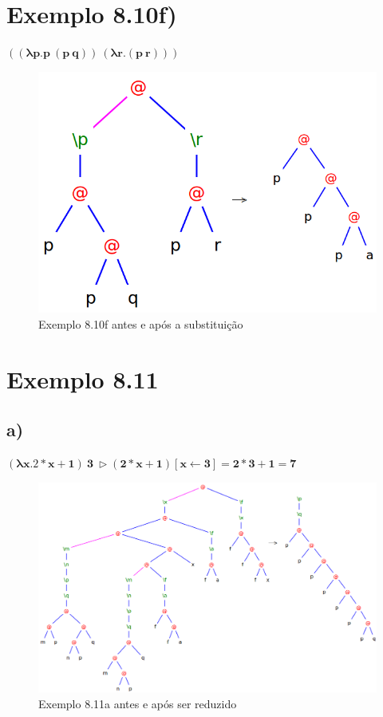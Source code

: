 \documentclass[a4paper]{article}
\begin{document}
\FloatBarrier

\section*{Exemplo 8.10f)}

$\mathbf{((\lambda p.p\ (p\ q))\ (\lambda r.(p\ r)))}$

\begin{figure}[h]
  \centering
  \includegraphics[scale=0.5]{8-10f.png}
  \caption{Exemplo 8.10f antes e após a substituição}
\end{figure}

\FloatBarrier

\section*{Exemplo 8.11}
\subsection*{a)}
$\mathbf{(\lambda x.2 * x + 1)\ 3\ \rhd (2 * x + 1) [x \leftarrow 3] = 2*3 + 1 = 7}$

\begin{figure}[h]
  \centering
  \includegraphics[scale=0.5]{8-11a_1.png}
  \caption{Exemplo 8.11a antes e após ser reduzido}
\end{figure}
\end{document}
